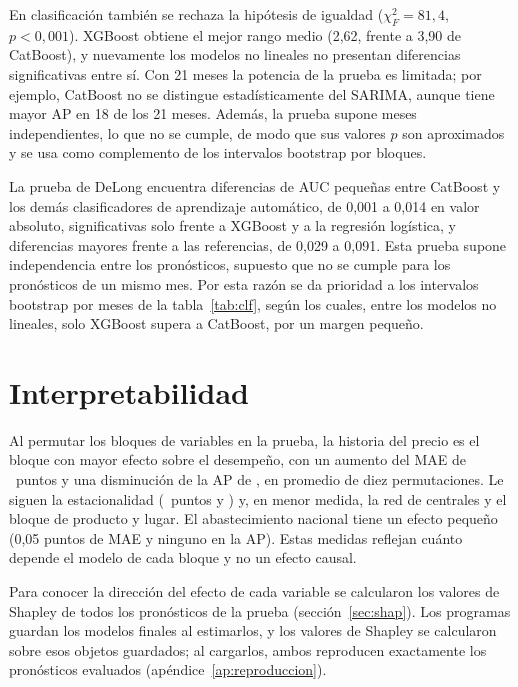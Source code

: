 En clasificación también se rechaza la hipótesis de igualdad ($\chi^2_F=81{,}4$, $p<0{,}001$). XGBoost obtiene el mejor rango medio (2,62, frente a 3,90 de CatBoost), y nuevamente los modelos no lineales no presentan diferencias significativas entre sí. Con 21 meses la potencia de la prueba es limitada; por ejemplo, CatBoost no se distingue estadísticamente del SARIMA, aunque tiene mayor AP en 18 de los 21 meses. Además, la prueba supone meses independientes, lo que no se cumple, de modo que sus valores $p$ son aproximados y se usa como complemento de los intervalos bootstrap por bloques.


La prueba de DeLong encuentra diferencias de AUC pequeñas entre CatBoost y los demás clasificadores de aprendizaje automático, de 0,001 a 0,014 en valor absoluto, significativas solo frente a XGBoost y a la regresión logística, y diferencias mayores frente a las referencias, de 0,029 a 0,091. Esta prueba supone independencia entre los pronósticos, supuesto que no se cumple para los pronósticos de un mismo mes. Por esta razón se da prioridad a los intervalos bootstrap por meses de la tabla~\ref{tab:clf}, según los cuales, entre los modelos no lineales, solo XGBoost supera a CatBoost, por un margen pequeño.

\section{Interpretabilidad}
\label{sec:res_importancia}

Al permutar los bloques de variables en la prueba, la historia del precio es el bloque con mayor efecto sobre el desempeño, con un aumento del MAE de \cibrhist\ puntos y una disminución de la AP de \cibchist, en promedio de diez permutaciones. Le siguen la estacionalidad (\cibrest\ puntos y \cibcest) y, en menor medida, la red de centrales y el bloque de producto y lugar. El abastecimiento nacional tiene un efecto pequeño (0,05 puntos de MAE y ninguno en la AP). Estas medidas reflejan cuánto depende el modelo de cada bloque y no un efecto causal.


Para conocer la dirección del efecto de cada variable se calcularon los valores de Shapley de todos los pronósticos de la prueba (sección~\ref{sec:shap}). Los programas guardan los modelos finales al estimarlos, y los valores de Shapley se calcularon sobre esos objetos guardados; al cargarlos, ambos reproducen exactamente los pronósticos evaluados (apéndice~\ref{ap:reproduccion}).

